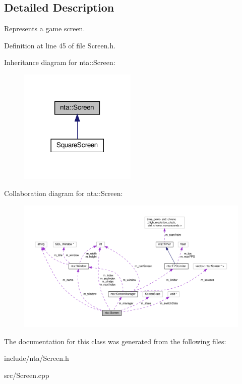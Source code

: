 \subsection{Detailed Description}
Represents a game screen. 

Definition at line 45 of file Screen.\+h.



Inheritance diagram for nta\+:\+:Screen\+:\nopagebreak
\begin{figure}[H]
\begin{center}
\leavevmode
\includegraphics[width=158pt]{d5/d0f/classnta_1_1Screen__inherit__graph}
\end{center}
\end{figure}


Collaboration diagram for nta\+:\+:Screen\+:
\nopagebreak
\begin{figure}[H]
\begin{center}
\leavevmode
\includegraphics[width=350pt]{d4/df6/classnta_1_1Screen__coll__graph}
\end{center}
\end{figure}


The documentation for this class was generated from the following files\+:\begin{DoxyCompactItemize}
\item 
include/nta/Screen.\+h\item 
src/Screen.\+cpp\end{DoxyCompactItemize}
